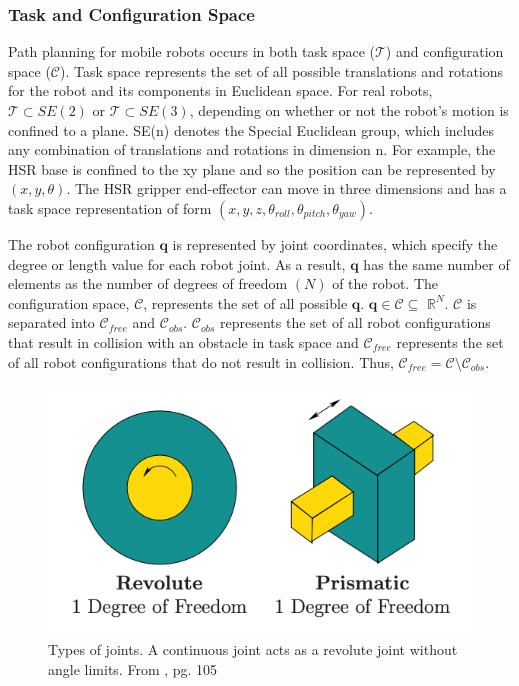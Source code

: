 \documentclass[12pt]{article}
\begin{document}
        \subsubsection{Task and Configuration Space}
            Path planning for mobile robots occurs in both task space ($\mathcal{T}$) and configuration space ($\mathcal{C}$). Task space represents the set of all possible translations and rotations for the robot and its components in Euclidean space. For real robots, $\mathcal{T}\subset SE(2)$ or $\mathcal{T}\subset SE(3)$, depending on whether or not the robot's motion is confined to a plane. SE(n) denotes the Special Euclidean group, which includes any combination of translations and rotations in dimension n. For example, the HSR base is confined to the xy plane and so the position can be represented by $(x,y, \theta)$. The HSR gripper end-effector can move in three dimensions and has a task space representation of form $(x,y,z,\theta_{roll}, \theta_{pitch}, \theta_{yaw})$.
            \par The robot configuration $\mathbf{q}$ is represented by joint coordinates, which specify the degree or length value for each robot joint. As a result, $\mathbf{q}$ has the same number of elements as the number of degrees of freedom $(N)$ of the robot. The configuration space, $\mathcal{C}$, represents the set of all possible $\mathbf{q}$. $\mathbf{q} \in \mathcal{C} \subseteq$ $\mathbb{R}^{N}$. $\mathcal{C}$ is separated into $\mathcal{C}_{free}$ and $\mathcal{C}_{obs}$. $\mathcal{C}_{obs}$ represents the set of all robot configurations that result in collision with an obstacle in task space and $\mathcal{C}_{free}$ represents the set of all robot configurations that do not result in collision. Thus, $\mathcal{C}_{free} = \mathcal{C} \setminus \mathcal{C}_{obs}$.\cite{lavalle_planning_2006}
            \begin{figure}[ht]
                \includegraphics[width=\linewidth]{screenshots/LaValle_joints}
                \centering
                \caption{Types of joints. A continuous joint acts as a revolute joint without angle limits. From \cite{lavalle_planning_2006}, pg. 105}
                \label{fig:joints_image}
            \end{figure}
\end{document}
